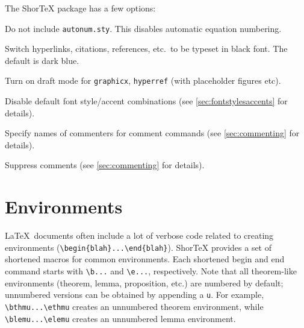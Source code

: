 \documentclass{article}
\begin{document}
The ShorTeX package has a few options:
\bdesc
\item[\texttt{noautonum}] Do not include \texttt{autonum.sty}. This disables automatic equation numbering.
\item[\texttt{blacklinks}] Switch hyperlinks, citations, references, etc.~to be typeset in black font. The default is dark blue.
\item[\texttt{draft}] Turn on draft mode for \texttt{graphicx}, \texttt{hyperref} (with placeholder figures etc).
\item[\texttt{nomathfontdefaults}] Disable default font style/accent combinations (see \cref{sec:fontstylesaccents} for details).
\item[\texttt{commenters}] Specify names of commenters for comment commands (see \cref{sec:commenting} for details).
\item[\texttt{hidecomments}] Suppress comments (see \cref{sec:commenting} for details).
\edesc

\newpage

\section{Environments}

\LaTeX~documents often include a lot of verbose code
related to creating environments (\verb!\begin{blah}...\end{blah}!). ShorTeX provides a set of
shortened macros for common environments.
Each shortened begin and end command starts with \verb!\b...! and \verb!\e...!, respectively.
Note that all theorem-like environments (theorem, lemma, proposition, etc.)
are numbered by default; unnumbered versions can be obtained by appending a \verb!u!. For example,
\verb!\bthmu...\ethmu! creates an unnumbered theorem environment, while
\verb!\blemu...\elemu! creates an unnumbered lemma environment.
\end{document}
